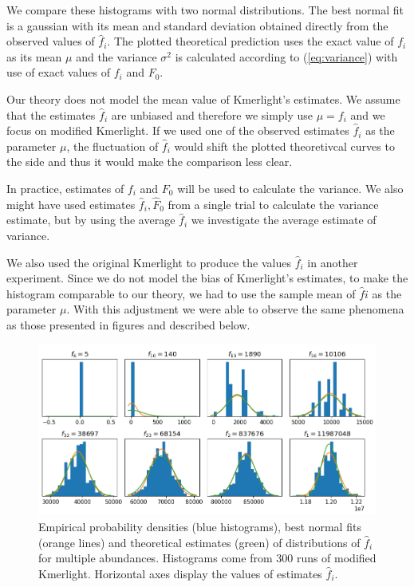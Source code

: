 We compare these histograms with two normal distributions. The best normal fit is a gaussian
with its mean and standard deviation obtained directly from the observed values of $\hat f_i$.
The plotted theoretical prediction uses the exact value of $f_i$ as its mean $\mu$ and
the variance $\sigma^2$ is calculated according to (\ref{eq:variance}) with use of exact values of 
$f_i$ and $F_0$. 

\medskip

Our theory does not model the mean value of Kmerlight's estimates. We assume that the estimates
$\hat f_i$ are unbiased and therefore we simply use $\mu = f_i$ and we focus on modified
Kmerlight. If we used one of the observed estimates $\hat f_i$ as the parameter $\mu$, the
fluctuation of $\hat f_i$ would shift the plotted theoretivcal curves to the side and thus it 
would make the comparison less clear. 

In practice, estimates of $f_i$ and $F_0$ will be used to calculate the variance. We also might
have used estimates $\hat f_i, \hat F_0$ from a single trial to calculate the variance estimate, 
but by using the average $\hat f_i$ we investigate the average estimate of variance.   

We also used the original Kmerlight to produce the values $\hat f_i$ in another experiment.
Since we do not model the bias of Kmerlight's estimates, to make the histogram comparable
to our theory, we had to use the sample mean of $\hat fi$ as the parameter $\mu$.
With this adjustment we were able to observe the same phenomena as those presented in figures and 
described below.


\begin{figure}[h]
\centerline{\includegraphics[width=1\textwidth, trim={0cm, 0.1cm, 0cm, 0cm}, clip]{images/pdf2.png}}
\caption[Density functions of $\hat f_i$]{Empirical probability densities (blue histograms), best
normal fits (orange lines) and theoretical estimates (green) of distributions of $\hat f_i$
for multiple abundances. Histograms come from 300 runs of modified Kmerlight.
Horizontal axes display the values of estimates $\hat f_i$.}
\label{img:estimated-pdf}
\end{figure}

